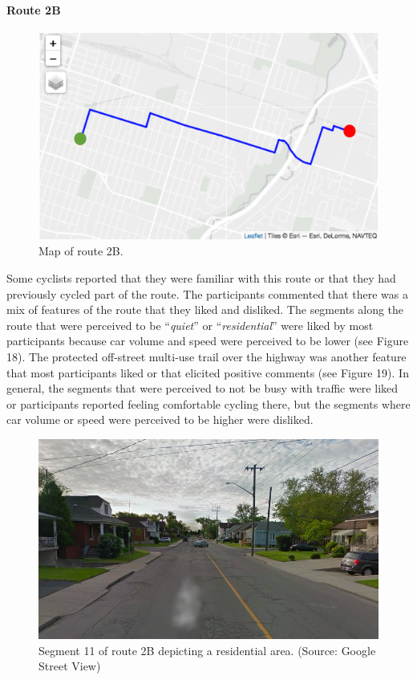 \documentclass[]{elsarticle} %
\begin{document}
\hypertarget{route-2b}{%
\paragraph{Route 2B}\label{route-2b}}

\begin{figure}

{\centering \includegraphics[width=0.65\linewidth]{Route 2B} 

}

\caption{Map of route 2B.}\label{fig:figure-17}
\end{figure}

Some cyclists reported that they were familiar with this route or that
they had previously cycled part of the route. The participants commented
that there was a mix of features of the route that they liked and
disliked. The segments along the route that were perceived to be
``\emph{quiet}'' or ``\emph{residential}'' were liked by most
participants because car volume and speed were perceived to be lower
(see Figure 18). The protected off-street multi-use trail over the
highway was another feature that most participants liked or that
elicited positive comments (see Figure 19). In general, the segments
that were perceived to not be busy with traffic were liked or
participants reported feeling comfortable cycling there, but the
segments where car volume or speed were perceived to be higher were
disliked.

\begin{figure}

{\centering \includegraphics[width=0.65\linewidth]{Figure 17} 

}

\caption{Segment 11 of route 2B depicting a residential area. (Source: Google Street View)}\label{fig:figure-18}
\end{figure}
\end{document}
